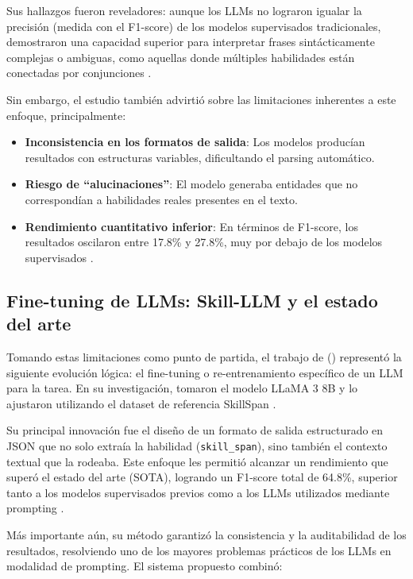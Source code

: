 Sus hallazgos fueron reveladores: aunque los LLMs no lograron igualar la precisión (medida con el F1-score) de los modelos supervisados tradicionales, demostraron una capacidad superior para interpretar frases sintácticamente complejas o ambiguas, como aquellas donde múltiples habilidades están conectadas por conjunciones \cite{nguyen2024}.

Sin embargo, el estudio también advirtió sobre las limitaciones inherentes a este enfoque, principalmente:

\begin{itemize}
    \item \textbf{Inconsistencia en los formatos de salida}: Los modelos producían resultados con estructuras variables, dificultando el parsing automático.
    \item \textbf{Riesgo de ``alucinaciones''}: El modelo generaba entidades que no correspondían a habilidades reales presentes en el texto.
    \item \textbf{Rendimiento cuantitativo inferior}: En términos de F1-score, los resultados oscilaron entre 17.8\% y 27.8\%, muy por debajo de los modelos supervisados \cite{nguyen2024}.
\end{itemize}

\subsection{Fine-tuning de LLMs: Skill-LLM y el estado del arte}

Tomando estas limitaciones como punto de partida, el trabajo de \citeauthor{herandi2024} (\citeyear{herandi2024}) representó la siguiente evolución lógica: el fine-tuning o re-entrenamiento específico de un LLM para la tarea. En su investigación, tomaron el modelo LLaMA 3 8B y lo ajustaron utilizando el dataset de referencia SkillSpan \cite{zhang2022}.

Su principal innovación fue el diseño de un formato de salida estructurado en JSON que no solo extraía la habilidad (\texttt{skill\_span}), sino también el contexto textual que la rodeaba. Este enfoque les permitió alcanzar un rendimiento que superó el estado del arte (SOTA), logrando un F1-score total de 64.8\%, superior tanto a los modelos supervisados previos como a los LLMs utilizados mediante prompting \cite{herandi2024}.

Más importante aún, su método garantizó la consistencia y la auditabilidad de los resultados, resolviendo uno de los mayores problemas prácticos de los LLMs en modalidad de prompting. El sistema propuesto combinó:

